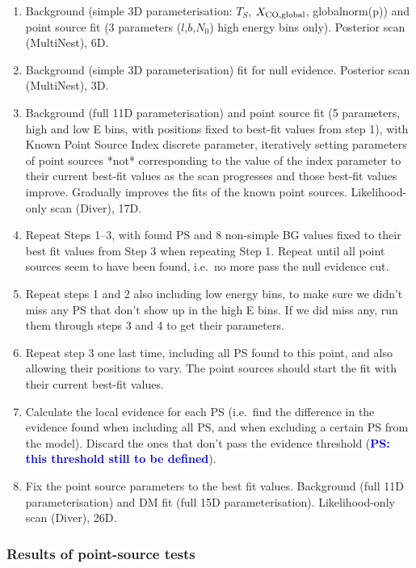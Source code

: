 \documentclass{article}
\newcommand{\ps}[1]{\textcolor{blue}{{\bf PS: #1}}}
\begin{document}
\begin{enumerate}
\item Background (simple 3D parameterisation: $T_S$, $X_{\rm CO, global}$, globalnorm(p)) and point source fit (3 parameters ($l$,$b$,$N_0$) high energy bins only).  Posterior scan (MultiNest), 6D.
\item Background (simple 3D parameterisation) fit for null evidence.  Posterior scan (MultiNest), 3D.
\item Background (full 11D parameterisation) and point source fit (5 parameters, high and low E bins, with positions fixed to best-fit values from step 1), with Known Point Source Index discrete parameter, iteratively setting parameters of point sources *not* corresponding to the value of the index parameter to their current best-fit values as the scan progresses and those best-fit values improve.  Gradually improves the fits of the known point sources.  Likelihood-only scan (Diver), 17D.
\item Repeat Steps 1--3, with found PS and 8 non-simple BG values fixed to their best fit values from Step 3 when repeating Step 1.  Repeat until all point sources seem to have been found, i.e.\ no more pass the null evidence cut.
\item Repeat steps 1 and 2 also including low energy bins, to make sure we didn't miss any PS that don't show up in the high E bins.  If we did miss any, run them through steps 3 and 4 to get their parameters.
\item Repeat step 3 one last time, including all PS found to this point, and also allowing their positions to vary.  The point sources should start the fit with their current best-fit values.
\item Calculate the local evidence for each PS (i.e.\ find the difference in the evidence found when including all PS, and when excluding a certain PS from the model). Discard the ones that don't pass the evidence threshold (\ps{this threshold still to be defined}).
\item Fix the point source parameters to the best fit values.  Background (full 11D parameterisation) and DM fit (full 15D parameterisation).  Likelihood-only scan (Diver), 26D.

\end{enumerate}

\subsubsection{Results of point-source tests}
\end{document}
